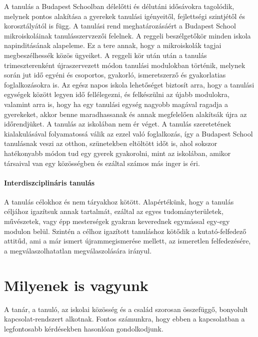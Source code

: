 A tanulás a Budapest Schoolban délelőtti és délutáni idősávokra tagolódik, melynek pontos
alakítása a gyerekek tanulási igényeitől, fejlettségi szintjétől és
korosztályától is függ. A tanulási rend meghatározásáért a Budapest
School mikroiskoláinak tanulásszervzezői felelnek. A reggeli
beszélgetőkör minden iskola napinditásának alapeleme. Ez a tere annak,
hogy a mikroiskolák tagjai megbeszélhessék közös ügyeiket. A reggeli kör
után után a tanulás trimeszterenként újraszervezett módon tanulási
modulokban történik, melynek során jut idő egyéni és csoportos,
gyakorló, ismeretszerző és gyakorlatias foglalkozásokra is. Az egész
napos iskola lehetőséget biztosít arra, hogy a tanulási egységek között
legyen idő fellélegezni, és felkészülni az újabb modulokra, valamint
arra is, hogy ha egy tanulási egység nagyobb magával ragadja a
gyerekeket, akkor benne maradhassanak és annak megfelelően alakítsák
újra az időrendjüket. A tanulás az iskolában nem ér véget. A tanulás szeretetének kialakulásával folyamatossá válik az ezzel való foglalkozás, így a Budapest School tanulásnak veszi az otthon, szünetekben eltöltött időt is, ahol sokszor hatékonyabb módon tud egy gyerek gyakorolni, mint az iskolában, amikor társaival van egy közösségben és ezáltal számos más inger is éri. 

\paragraph{Interdiszciplináris tanulás}

A tanulás célokhoz és nem táryakhoz kötött. Alapértékünk, hogy a tanulás céljához igazítsuk annak tartalmát, ezáltal az egyes tudományterületek, művészetek, vagy épp mesterségek gyakran keverednek egymással egy-egy modulon belül. Szintén a célhoz igazított tanuláshoz kötődik a kutató-felfedező attitűd, ami a már ismert újrammegismerése mellett, az ismeretlen felfedezésére,
a megválaszolhatatlan megválaszolására irányul.

\section{Milyenek is vagyunk}
\label{sec:milyenek_vagyunk}

A tanár, a tanuló, az iskolai közösség és a család szorosan összefüggő, bonyolult kapcsolat-rendszert alkotnak. Fontos számunkra, hogy ebben a kapcsolatban a legfontosabb kérdésekben hasonlóan gondolkodjunk.
